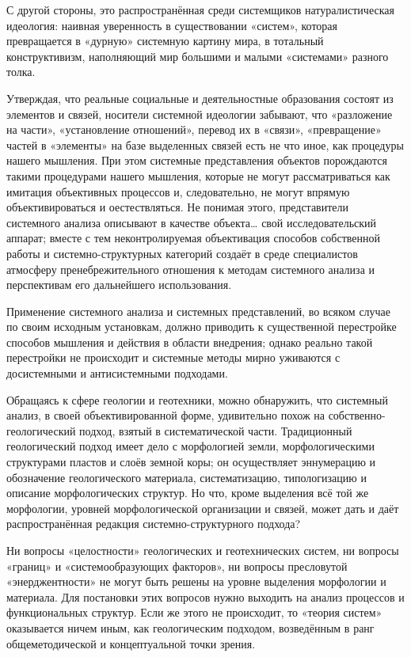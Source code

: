 \documentclass[11pt,a4paper]{article}
\begin{document}
С другой стороны, это распространённая среди системщиков натуралистическая
идеология: наивная уверенность в существовании «систем», которая превращается
в «дурную» системную картину мира, в тотальный конструктивизм, наполняющий мир
большими и малыми «системами» разного толка.

Утверждая, что реальные социальные и деятельностные образования состоят из
элементов и связей, носители системной идеологии забывают, что «разложение на
части», «установление отношений», перевод их в «связи», «превращение» частей в
«элементы» на базе выделенных связей есть не что иное, как процедуры нашего
мышления. При этом системные представления объектов порождаются такими
процедурами нашего мышления, которые не могут рассматриваться как имитация
объективных процессов и, следовательно, не могут впрямую объективироваться и
оестествляться. Не понимая этого, представители системного анализа описывают в
качестве объекта… свой исследовательский аппарат; вместе с тем
неконтролируемая объективация способов собственной работы и
системно-структурных категорий создаёт в среде специалистов атмосферу
пренебрежительного отношения к методам системного анализа и перспективам его
дальнейшего использования. 

Применение системного анализа и системных представлений, во всяком случае по
своим исходным установкам, должно приводить к существенной перестройке
способов мышления и действия в области внедрения; однако реально такой
перестройки не происходит и системные методы мирно уживаются с досистемными и
антисистемными подходами. 

Обращаясь к сфере геологии и геотехники, можно обнаружить, что системный
анализ, в своей объективированной форме, удивительно похож на
собственно-геологический подход, взятый в систематической части. Традиционный
геологический подход имеет дело с морфологией земли, морфологическими
структурами пластов и слоёв земной коры; он осуществляет эннумерацию и
обозначение геологического материала, систематизацию, типологизацию и описание
морфологических структур. Но что, кроме выделения всё той же морфологии,
уровней морфологической организации и связей, может дать и даёт
распространённая редакция системно-структурного подхода? 

Ни вопросы «целостности» геологических и геотехнических систем, ни вопросы
«границ» и «системообразующих факторов», ни вопросы пресловутой
«энерджентности» не могут быть решены на уровне выделения морфологии и
материала. Для постановки этих вопросов нужно выходить на анализ процессов и
функциональных структур. Если же этого не происходит, то «теория систем»
оказывается ничем иным, как геологическим подходом, возведённым в ранг
общеметодической и концептуальной точки зрения. 
\end{document}
